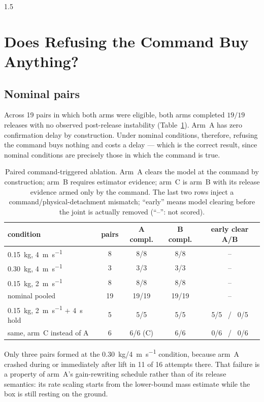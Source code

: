 \begin{spacing}{1.5}
\section{Does Refusing the Command Buy Anything?}\label{sec:eval:paired}

\subsection{Nominal pairs}\label{sec:eval:nominal}

Across 19 pairs in which both arms were eligible, both arms completed $19/19$
releases with no observed post-release instability
(Table~\ref{tab:paired-event}). Arm~A has zero confirmation delay by
construction. Under nominal conditions, therefore, refusing the command buys
nothing and costs a delay --- which is the correct result, since nominal
conditions are precisely those in which the command is true.

\begin{table}[ht]
\centering
\caption{Paired command-triggered ablation. Arm~A clears the model at the command
by construction; arm~B requires estimator evidence; arm~C is arm~B with its
release evidence armed only by the command. The last two rows inject a
command/physical-detachment mismatch; ``early'' means model clearing before the
joint is actually removed (``--'': not scored).}
\label{tab:paired-event}
\small
\begin{tabular}{@{}lcccc@{}}
\toprule
condition & pairs & A compl. & B compl. & early clear A/B \\
\midrule
\SI{0.15}{\kg}, \SI{4}{\meter\per\second} & 8 & 8/8 & 8/8 & -- \\
\SI{0.30}{\kg}, \SI{4}{\meter\per\second} & 3 & 3/3 & 3/3 & -- \\
\SI{0.15}{\kg}, \SI{2}{\meter\per\second} & 8 & 8/8 & 8/8 & -- \\
\midrule
nominal pooled & 19 & 19/19 & 19/19 & -- \\
\SI{0.15}{\kg}, \SI{2}{\meter\per\second} $+$ \SI{4}{\second} hold & 5 & 5/5 & 5/5 & 5/5 \ / \ 0/5 \\
\quad same, arm~C instead of A & 6 & 6/6 (C) & 6/6 & 0/6 \ / \ 0/6 \\
\bottomrule
\end{tabular}
\end{table}

Only three pairs formed at the \SI{0.30}{\kg}/\SI{4}{\meter\per\second}
condition, because arm~A crashed during or immediately after lift in 11 of 16
attempts there. That failure is a property of arm~A's gain-rewriting schedule
rather than of its release semantics: its rate scaling starts from the
lower-bound mass estimate while the box is still resting on the ground.


\end{spacing}
